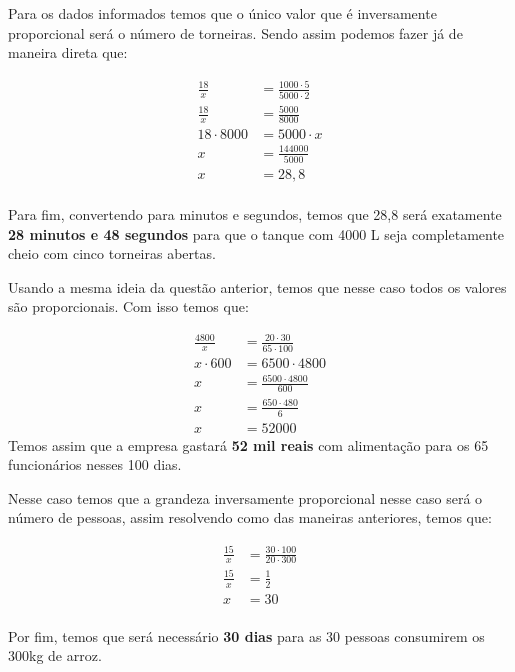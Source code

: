\documentclass{scrartcl} %
\begin{document}
\begin{multicols}{2}
\setlength\columnseprule{1pt}
\def\columnseprulecolor{\color{corlinha}}%

\begin{question}
Para os dados informados temos que o único valor que é inversamente proporcional será o número de torneiras. Sendo assim podemos fazer já de maneira direta que:

\begin{align*}
\frac{18}{x} &= \frac{1000 \cdot 5}{5000 \cdot 2}\\
\frac{18}{x}&= \frac{5000}{8000}\\
18 \cdot 8000&= 5000 \cdot x \\
x &=  \frac{144 000}{5000}\\
x&= 28,8\\
 \end{align*}
 
Para fim, convertendo para minutos e segundos, temos que 28,8 será exatamente \textbf{28 minutos e 48 segundos} para que o tanque com 4000 L seja completamente cheio com cinco torneiras abertas.
\end{question}

\begin{question}
Usando a mesma ideia da questão anterior, temos que nesse caso todos os valores são proporcionais. Com isso temos que:

\begin{align*}
\frac{4800}{x}&= \frac{20 \cdot 30}{ 65 \cdot 100} \\
x \cdot 600 &= 6500 \cdot 4800\\
x &=  \frac{6500 \cdot 4800}{600}\\
x &= \frac{650 \cdot 480}{6}\\
x & = 52 000
 \end{align*}
 Temos assim que a empresa gastará \textbf{52 mil reais} com alimentação para os 65 funcionários nesses 100 dias.
\end{question}

\begin{question}
Nesse caso temos que a grandeza inversamente proporcional nesse caso será o número de pessoas, assim resolvendo como das maneiras anteriores, temos que:

\begin{align*}
\frac{15}{x} &= \frac{30 \cdot 100}{ 20 \cdot 300} \\
\frac{15}{x}&= \frac{1}{2} \\
x &=  30\\
 \end{align*}

Por fim, temos que será necessário \textbf{30 dias} para as 30 pessoas consumirem os 300kg de arroz.
\end{question}

\end{multicols}
\end{document}

